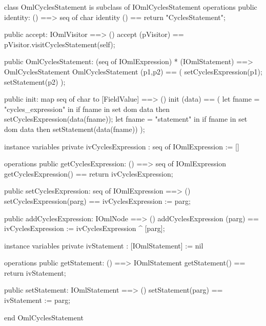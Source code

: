 \begin{vdm_al}
class OmlCyclesStatement is subclass of IOmlCyclesStatement
operations
  public identity: () ==> seq of char
  identity () == return "CyclesStatement";

  public accept: IOmlVisitor ==> ()
  accept (pVisitor) == pVisitor.visitCyclesStatement(self);

  public OmlCyclesStatement:
      (seq of IOmlExpression) *
      (IOmlStatement) ==> OmlCyclesStatement
  OmlCyclesStatement (p1,p2) == 
   ( setCyclesExpression(p1);
     setStatement(p2) );

  public init: map seq of char to [FieldValue] ==> ()
  init (data) ==
    ( let fname = "cycles_expression" in
        if fname in set dom data
        then setCyclesExpression(data(fname));
      let fname = "statement" in
        if fname in set dom data
        then setStatement(data(fname)) );

instance variables
  private ivCyclesExpression : seq of IOmlExpression := []

operations
  public getCyclesExpression: () ==> seq of IOmlExpression
  getCyclesExpression() == return ivCyclesExpression;

  public setCyclesExpression: seq of IOmlExpression ==> ()
  setCyclesExpression(parg) == ivCyclesExpression := parg;

  public addCyclesExpression: IOmlNode ==> ()
  addCyclesExpression (parg) == ivCyclesExpression := ivCyclesExpression ^ [parg];

instance variables
  private ivStatement : [IOmlStatement] := nil

operations
  public getStatement: () ==> IOmlStatement
  getStatement() == return ivStatement;

  public setStatement: IOmlStatement ==> ()
  setStatement(parg) == ivStatement := parg;

end OmlCyclesStatement
\end{vdm_al}

